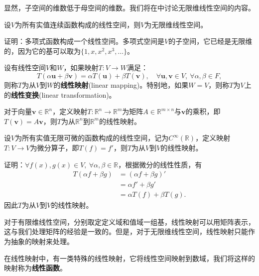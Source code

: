 显然，子空间的维数低于母空间的维数。我们将在中讨论无限维线性空间的内容。

\begin{example}
    设$V$为所有实值连续函数构成的线性空间，则$V$为无限维线性空间。

    证明：多项式函数构成一个线性空间。多项式空间是$V$的子空间，它已经是无限维的，因为它的基可以取为$\{1,x,x^2,x^3,\ldots\}$。
\end{example}

\begin{definition}[线性映射]
    设有线性空间$V$和$W$，如果映射$T:V\to W$满足：
    \begin{equation}
        T(\alpha \mathbf{u}+\beta \mathbf{v})=\alpha T(\mathbf{u})+\beta T(\mathbf{v}),\quad \forall \mathbf{u},\mathbf{v}\in V,\ \forall \alpha,\beta\in F,
    \end{equation}
    则称$T$为从$V$到$W$的\textbf{线性映射}(linear mapping)。特别地，如果$W=V$，则称$T$为$V$上的\textbf{线性变换}(linear transformation)。
\end{definition}

\begin{example}
    对于向量$\mathbf{v}\in\mathbb{R}^n$，定义映射$T:\mathbb{R}^n\to\mathbb{R}^m$为矩阵$A\in\mathbb{R}^{m\times n}$与$\mathbf{v}$的乘积，即$T(\mathbf{v})=A\mathbf{v}$，则$T$为从$\mathbb{R}^n$到$\mathbb{R}^m$的线性映射。
\end{example}

\begin{example}
    设$V$为所有实值无限可微的函数构成的线性空间，记为$C^\infty(\mathbb{R})$，定义映射$T:V\to V$为微分算子，即$T(f)=f'$，则$T$为从$V$到$V$的线性映射。

    证明：$\forall f(x),g(x)\in V,\ \forall \alpha,\beta\in \mathbb{R}$，根据微分的线性性质，有
    \begin{align}
        T(\alpha f+\beta g)&=(\alpha f+\beta g)'\nonumber\\
        &=\alpha f'+\beta g'\nonumber\\
        &=\alpha T(f)+\beta T(g).
    \end{align}
    因此$T$为从$V$到$V$的线性映射。
\end{example}

对于有限维线性空间，分别取定定义域和值域一组基，线性映射可以用矩阵表示，这与我们处理矩阵的经验是一致的。但是，对于无限维线性空间，线性映射只能作为抽象的映射来处理。

在线性映射中，有一类特殊的线性映射，它将线性空间映射到数域，我们将这样的映射称为\textbf{线性函数}。

